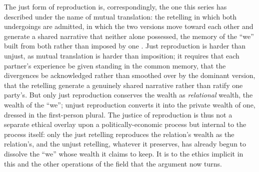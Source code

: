 The just form of reproduction is, correspondingly, the one this series has described under the name of mutual translation: the retelling in which both undergoings are admitted, in which the two versions move toward each other and generate a shared narrative that neither alone possessed, the memory of the ``we'' built from both rather than imposed by one \parencite{paperxiii}. Just reproduction is harder than unjust, as mutual translation is harder than imposition; it requires that each partner's experience be given standing in the common memory, that the divergences be acknowledged rather than smoothed over by the dominant version, that the retelling generate a genuinely shared narrative rather than ratify one party's. But only just reproduction conserves the wealth as \emph{relational} wealth, the wealth of the ``we''; unjust reproduction converts it into the private wealth of one, dressed in the first-person plural. The justice of reproduction is thus not a separate ethical overlay upon a politically-economic process but internal to the process itself: only the just retelling reproduces the relation's wealth as the relation's, and the unjust retelling, whatever it preserves, has already begun to dissolve the ``we'' whose wealth it claims to keep. It is to the ethics implicit in this and the other operations of the field that the argument now turns.
